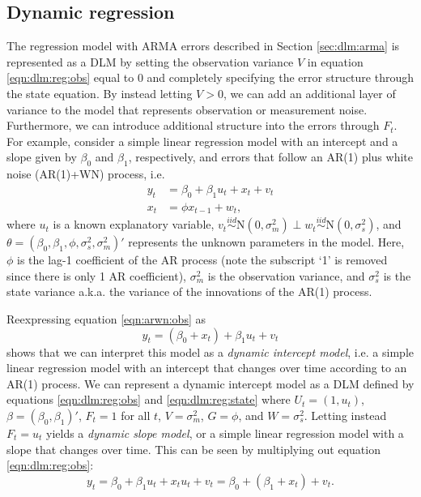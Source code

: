 \subsection{Dynamic regression \label{sec:dlm:arwn}}

The regression model with ARMA errors described in Section \ref{sec:dlm:arma} is represented as a DLM by setting the observation variance $V$ in equation \eqref{eqn:dlm:reg:obs} equal to 0 and completely specifying the error structure through the state equation. By instead letting $V > 0$, we can add an additional layer of variance to the model that represents observation or measurement noise. Furthermore, we can introduce additional structure into the errors through $F_t$. For example, consider a simple linear regression model with an intercept and a slope given by $\beta_0$ and $\beta_1$, respectively, and errors that follow an AR(1) plus white noise (AR(1)+WN) process, i.e.
\begin{align}
y_t &= \beta_0 + \beta_1u_t + x_t + v_t \label{eqn:arwn:obs} \\
x_t &= \phi x_{t-1} + w_t, \label{eqn:arwn:state}
\end{align}
where $u_t$ is a known explanatory variable, $v_t \stackrel{iid}{\sim} \mbox{N}(0, \sigma^2_m) \perp w_t \stackrel{iid}{\sim} \mbox{N}(0, \sigma^2_s)$, and $\theta = (\beta_0,\beta_1,\phi,\sigma^2_s,\sigma^2_m)'$ represents the unknown parameters in the model. Here, $\phi$ is the lag-1 coefficient of the AR process (note the subscript `1' is removed since there is only 1 AR coefficient), $\sigma^2_m$ is the observation variance, and $\sigma^2_s$ is the state variance a.k.a. the variance of the innovations of the AR(1) process.

Reexpressing equation \eqref{eqn:arwn:obs} as
\begin{equation}
y_t = (\beta_0 + x_t) + \beta_1u_t + v_t \label{eqn:arwn:dynint}
\end{equation}
shows that we can interpret this model as a \emph{dynamic intercept model}, i.e. a simple linear regression model with an intercept that changes over time according to an AR(1) process. We can represent a dynamic intercept model as a DLM defined by equations \eqref{eqn:dlm:reg:obs} and \eqref{eqn:dlm:reg:state} where $U_t = (1, u_t)$, $\beta = (\beta_0, \beta_1)'$, $F_t = 1$ for all $t$, $V = \sigma^2_m$, $G = \phi$, and $W = \sigma^2_s$. Letting instead $F_t = u_t$ yields a \emph{dynamic slope model}, or a simple linear regression model with a slope that changes over time. This can be seen by multiplying out equation \eqref{eqn:dlm:reg:obs}:
\begin{equation}
y_t = \beta_0 + \beta_1u_t + x_tu_t + v_t = \beta_0 + (\beta_1 + x_t) + v_t. \label{eqn:arwn:dynslo}
\end{equation}

